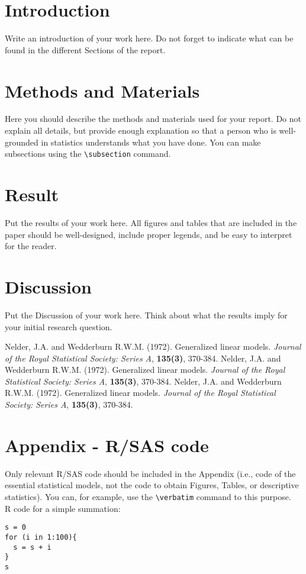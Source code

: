 \documentclass[11pt]{article}
\begin{document}
\section{Introduction}\label{introduction}
Write an introduction of your work here. Do not forget to indicate what can be found in the different Sections of the report.

\section{Methods and Materials}\label{methods}
Here you should describe the methods and materials used for your report. Do not explain all details, but provide enough explanation so that a person who is well-grounded in statistics understands what you have done. You can make subsections using the \verb|\subsection| command.

\section{Result}\label{result}
Put the results of your work here. All figures and tables that are included in the paper should be well-designed, include proper legends, and be easy to interpret for the reader.

\section{Discussion}\label{discussion}
Put the Discussion of your work here. Think about what the results imply for your initial research question.

\begin{thebibliography}{9}
\bibitem{} Nelder, J.A. and Wedderburn R.W.M. (1972). Generalized linear models. \textit{Journal of the Royal Statistical Society: Series A}, \textbf{135(3)}, 370-384. 
\bibitem{} Nelder, J.A. and Wedderburn R.W.M. (1972). Generalized linear models. \textit{Journal of the Royal Statistical Society: Series A}, \textbf{135(3)}, 370-384. 
\bibitem{} Nelder, J.A. and Wedderburn R.W.M. (1972). Generalized linear models. \textit{Journal of the Royal Statistical Society: Series A}, \textbf{135(3)}, 370-384. 
\end{thebibliography}

\section*{Appendix - R/SAS code}\label{appendix}
Only relevant R/SAS code should be included in the Appendix (i.e., code of the essential statistical models, not the code to obtain Figures, Tables, or descriptive statistics). You can, for example, use the \verb|\verbatim| command to this purpose.\\

R code for a simple summation:
\begin{verbatim}
s = 0
for (i in 1:100){
  s = s + i
}
s
\end{verbatim}
\end{document}
